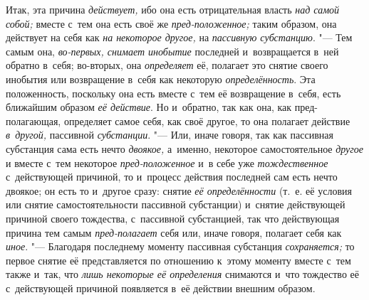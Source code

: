 Итак, эта причина {\em действует,} ибо она есть отрицательная власть
{\em над самой собой;} вместе с~тем она есть своё же {\em пред-положенное;}
таким образом, она действует на себя как {\em на некоторое другое,} на
{\em пассивную субстанцию}. "--- Тем самым она,
{\em во-первых, снимает инобытие} последней и~возвращается в~ней обратно
в~себя; во-вторых, она {\em определяет} её, полагает это снятие своего инобытия
или возвращение в~себя как некоторую {\em определённость}. Эта положенность,
поскольку она есть вместе с~тем её возвращение в~себя, есть ближайшим образом
{\em её действие}. Но и~обратно, так как она, как пред-полагающая, определяет
самое себя, как своё другое, то она полагает действие {\em в~другой,} пассивной
{\em субстанции}. "--- Или, иначе говоря, так как пассивная субстанция сама
есть нечто {\em двоякое,} а~именно, некоторое самостоятельное {\em другое} и
вместе с~тем некоторое {\em пред-положенное} и~в себе уже {\em тождественное}
с~действующей причиной, то и~процесс действия последней сам есть нечто двоякое;
он есть то и~другое сразу: снятие {\em её определённости} (т.~е. её условия или
снятие самостоятельности пассивной субстанции) и~снятие действующей причиной
своего тождества, с~пассивной субстанцией, так что действующая причина тем
самым {\em пред-полагает} себя или, иначе говоря, полагает себя как
{\em иное}. "--- Благодаря последнему моменту пассивная субстанция
{\em сохраняется;} то первое снятие её представляется по отношению к~этому
моменту вместе с~тем также и~так, что {\em лишь некоторые её определения}
снимаются и~что тождество её с~действующей причиной появляется
в~её действии внешним образом.

